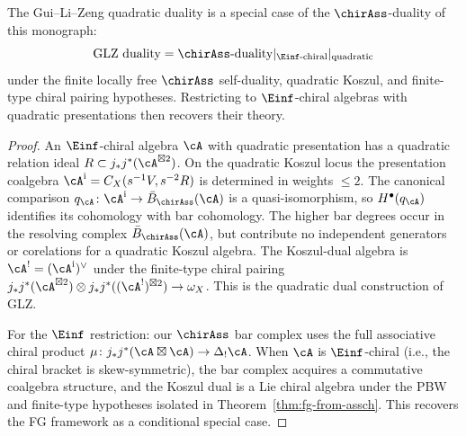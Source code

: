 \begin{proposition}\label{prop:glz-special-case}
The Gui--Li--Zeng quadratic duality is a special case of the $\chirAss$-duality of this monograph:
\[
\text{GLZ duality} = \chirAss\text{-duality} |_{\Einf\text{-chiral}} |_{\text{quadratic}}
\]
under the finite locally free $\chirAss$ self-duality, quadratic
Koszul, and finite-type chiral pairing hypotheses. Restricting to
$\Einf$-chiral algebras with quadratic presentations then recovers
their theory.
\end{proposition}

\begin{proof}
An $\Einf$-chiral algebra $\cA$ with quadratic presentation has a
quadratic relation ideal
$R \subset j_*j^*(\cA^{\boxtimes 2})$. On the quadratic Koszul locus
the presentation coalgebra
$\cA^{\mathrm i}=C_X(s^{-1}V,s^{-2}R)$ is determined in weights
$\leq2$. The canonical comparison
$q_\cA\colon\cA^{\mathrm i}\to\bar B_{\chirAss}(\cA)$ is a
quasi-isomorphism, so $H^\bullet(q_\cA)$ identifies its cohomology
with bar cohomology.
The higher bar degrees occur in the resolving complex
$\bar{B}_{\chirAss}(\cA)$, but contribute no independent generators
or corelations for a quadratic Koszul algebra. The
Koszul-dual algebra is
$\cA^!=(\cA^{\mathrm i})^\vee$ under the finite-type chiral pairing
$j_*j^*(\cA^{\boxtimes 2}) \otimes
j_*j^*((\cA^!)^{\boxtimes 2}) \to \omega_X$. This is the
quadratic dual construction of GLZ.

For the $\Einf$ restriction: our $\chirAss$ bar complex uses the full associative chiral product $\mu\colon j_*j^*(\cA \boxtimes \cA) \to \Delta_!\cA$. When $\cA$ is $\Einf$-chiral (i.e., the chiral bracket is skew-symmetric), the bar complex acquires a commutative coalgebra structure, and the Koszul dual is a Lie chiral algebra under the PBW and finite-type hypotheses isolated in Theorem~\ref{thm:fg-from-assch}. This recovers the FG framework as a conditional special case.
\end{proof}

